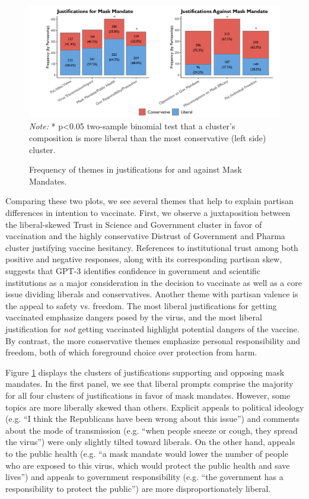 \documentclass{article} %
\begin{document}
\begin{figure}[H]
  \captionsetup{justification=raggedright,singlelinecheck=false}
  \caption{Frequency of themes in justifications for and against Mask Mandates.}
  \label{fig:partisan6}
  \centering
  \includegraphics[width=\textwidth]{./figures/media/image10.png}
  \smallskip %
  \small %
  \\ \textit{Note:} * p\textless0.05 two-sample binomial test that a cluster's composition is more liberal than the most conservative (left side) cluster. %
\end{figure}

Comparing these two plots, we see several themes that help to explain
partisan differences in intention to vaccinate. First, we observe a
juxtaposition between the liberal-skewed Trust in Science and Government
cluster in favor of vaccination and the highly conservative Distrust of
Government and Pharma cluster justifying vaccine hesitancy. References
to institutional trust among both positive and negative responses, along
with its corresponding partisan skew, suggests that GPT-3 identifies
confidence in government and scientific institutions as a major
consideration in the decision to vaccinate as well as a core issue
dividing liberals and conservatives. Another theme with partisan valence
is the appeal to safety vs. freedom. The most liberal justifications for
getting vaccinated emphasize dangers posed by the virus, and the most
liberal justification for \emph{not} getting vaccinated highlight
potential dangers of the vaccine. By contrast, the more conservative
themes emphasize personal responsibility and freedom, both of which
foreground choice over protection from harm.

Figure \ref{fig:partisan6} displays the clusters of justifications supporting and
opposing mask mandates. In the first panel, we see that liberal prompts
comprise the majority for all four clusters of justifications in favor
of mask mandates. However, some topics are more liberally skewed than
others. Explicit appeals to political ideology (e.g. ``I think the
Republicans have been wrong about this issue'') and comments about the
mode of transmission (e.g. ``when people sneeze or cough, they spread
the virus'') were only slightly tilted toward liberals. On the other
hand, appeals to the public health (e.g. ``a mask mandate would lower
the number of people who are exposed to this virus, which would protect
the public health and save lives'') and appeals to government
responsibility (e.g. ``the government has a responsibility to protect
the public'') are more disproportionately liberal.
\end{document}

